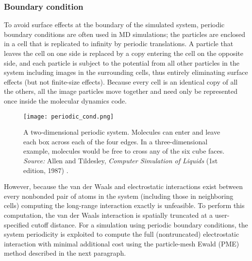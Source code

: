 
\vspace{0.25cm}

\subsubsection{Boundary condition}
To avoid surface effects at the boundary of the simulated system, periodic boundary conditions are often used in MD simulations; the particles are enclosed in a cell that is replicated to infinity by periodic translations. A particle that leaves the cell on one side is replaced by a copy entering the cell on the opposite side, and each particle is subject to the potential from all other particles in the system including images in the surrounding cells, thus entirely eliminating surface effects (but not finite-size effects). Because every cell is an identical copy of all the others, all the image particles move together and need only be represented once inside the molecular dynamics code.
\begin{figure}[H]
\centering
\begin{minipage}[t]{0.75\textwidth}
	\centering
    \texttt{[image: periodic\_cond.png]}
    
    \footnotesize{\caption{A two-dimensional periodic system. Molecules can enter and leave each box across each of the four edges. In a three-dimensional example, molecules would be free to cross any of the six cube faces.
    \textit{Source:} Allen and Tildesley, \textit{Computer Simulation of Liquids} (1st edition, 1987) 
    \cite{ref:AllenTildesley_1ed}.}
    \label{fig:PME}
    }
\end{minipage} 
\end{figure}


However, because the van der Waals and electrostatic interactions exist between every nonbonded pair of atoms in the system (including those in neighboring cells) computing the long-range interaction exactly is unfeasible. To perform this computation, the van der Waals interaction is spatially truncated at a user-specified cutoff distance. For a simulation using periodic boundary conditions, the system periodicity is exploited to compute the full (nontruncated) electrostatic interaction with minimal additional cost using the particle-mesh Ewald (PME) method described in the next paragraph.

